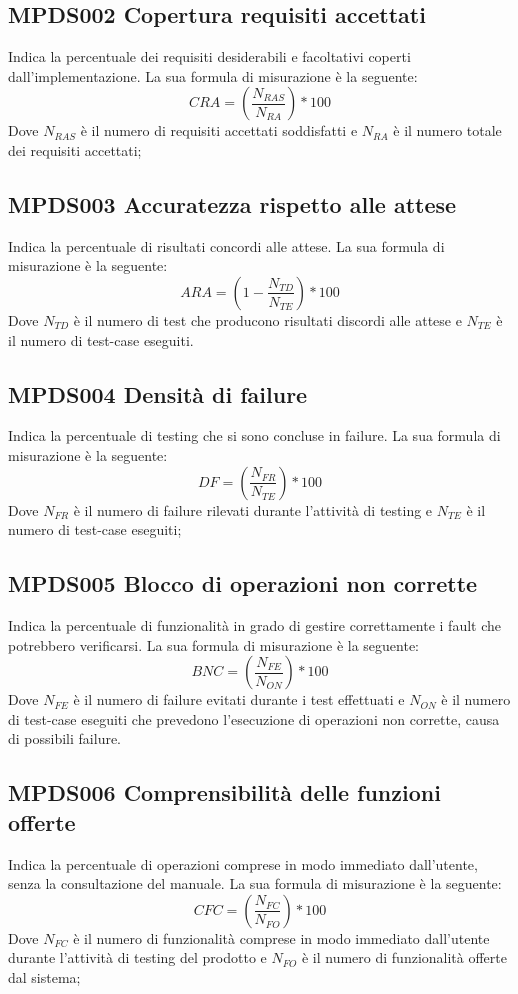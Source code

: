 \documentclass[NormeDiProgetto.tex]{subfiles}
\begin{document}
		\subsection{MPDS002 Copertura requisiti accettati} Indica la percentuale dei requisiti desiderabili e facoltativi coperti dall'implementazione. La sua formula di misurazione è la seguente: \[CRA=(\frac{N_{RAS}}{N_{RA}})*100\] Dove $ N_{RAS} $ è il numero di requisiti accettati soddisfatti e $ N_{RA } $ è il numero totale dei requisiti accettati;
		\subsection{MPDS003 Accuratezza rispetto alle attese} Indica la percentuale di risultati concordi alle attese. La sua formula di misurazione è la seguente: \[ARA=(1-\frac{N_{TD}}{N_{TE}})*100\] Dove $ N_{TD} $ è il numero di test che producono risultati discordi alle attese e $ N_{TE} $ è il numero di test-case eseguiti.
	
\subsection{MPDS004 Densità di failure} Indica la percentuale di testing che si sono concluse in failure. La sua formula di misurazione è la seguente: \[DF=(\frac{N_{FR}}{N_{TE}})*100\] Dove $ N_{FR} $ è il numero di failure rilevati durante l'attività di testing e $ N_{TE} $ è il numero di test-case eseguiti;
\subsection{MPDS005 Blocco di operazioni non corrette} Indica la percentuale di funzionalità in grado di gestire correttamente i fault che potrebbero verificarsi. La sua formula di misurazione è la seguente: \[BNC=(\frac{N_{FE}}{N_{ON}})*100\] Dove $ N_{FE} $ è il numero di failure evitati durante i test effettuati e $ N_{ON} $ è il numero di test-case eseguiti che prevedono l'esecuzione di operazioni non corrette, causa di possibili failure.

\subsection{MPDS006 Comprensibilità delle funzioni offerte} Indica la percentuale di operazioni comprese in modo immediato dall'utente, senza la consultazione del manuale. La sua formula di misurazione è la seguente: \[CFC=(\frac{N_{FC}}{N_{FO}})*100\] Dove $ N_{FC} $ è il numero di funzionalità comprese in modo immediato dall'utente durante l'attività di testing del prodotto e $ N_{FO} $ è il numero di funzionalità offerte dal sistema;
\end{document}
